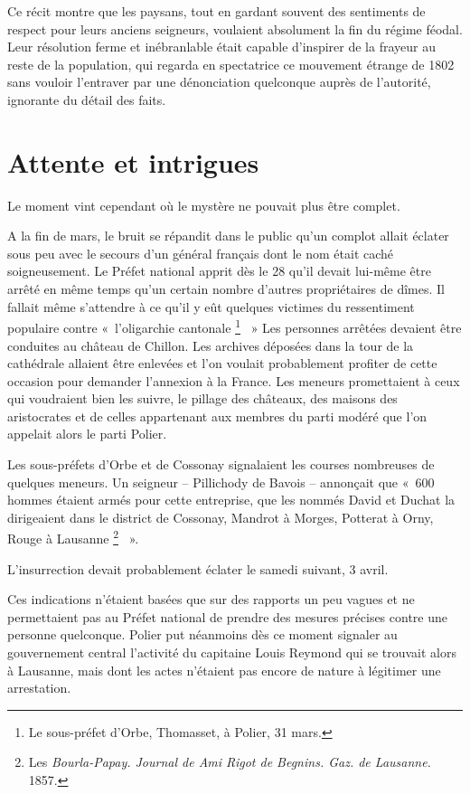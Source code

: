\documentclass[french,twoside]{book} %
\begin{document}
\noindent Ce récit montre que les paysans, tout en gardant souvent des sentiments de respect pour leurs anciens seigneurs, voulaient absolument la fin du régime féodal. Leur résolution ferme et inébranlable était capable d’inspirer de la frayeur au reste de la population, qui regarda en spectatrice ce mouvement étrange de 1802 sans vouloir l’entraver par une dénonciation quelconque auprès de l’autorité, ignorante du détail des faits.
\section[{Attente et intrigues}]{Attente et intrigues}
\noindent Le moment vint cependant où le mystère ne pouvait plus être complet.\par
A la fin de mars, le bruit se répandit dans le public qu’un complot allait éclater sous peu avec le secours d’un général français dont le nom était caché soigneusement. Le Préfet national apprit dès le 28 qu’il devait lui-même être arrêté en même temps qu’un certain nombre d’autres propriétaires de dîmes. Il fallait même s’attendre à ce qu’il y eût quelques victimes du ressentiment populaire contre « l’oligarchie cantonale \footnote{Le sous-préfet d’Orbe, Thomasset, à Polier, 31 mars.}  » Les personnes arrêtées devaient être conduites au château de Chillon. Les archives déposées dans la tour de la cathédrale allaient être enlevées et l’on voulait probablement profiter de cette occasion pour demander l’annexion à la France. Les meneurs promettaient à ceux qui voudraient bien les suivre, le pillage des châteaux, des maisons des aristocrates et de celles appartenant aux membres du parti modéré que l’on appelait alors le parti Polier.\par
Les sous-préfets d’Orbe et de Cossonay signalaient les courses nombreuses de quelques meneurs. Un seigneur – Pillichody de Bavois – annonçait que « 600 hommes étaient armés pour cette entreprise, que les nommés David et Duchat la dirigeaient dans le district de Cossonay, Mandrot à Morges, Potterat à Orny, Rouge à Lausanne \footnote{Les \emph{Bourla-Papay. Journal de Ami Rigot de Begnins. Gaz. de Lausanne.} 1857.}  ».\par
L’insurrection devait probablement éclater le samedi suivant, 3 avril.\par
Ces indications n’étaient basées que sur des rapports un peu vagues et ne permettaient pas au Préfet national de prendre des mesures précises contre une personne quelconque. Polier put néanmoins dès ce moment signaler au gouvernement central l’activité du capitaine Louis Reymond qui se trouvait alors à Lausanne, mais dont les actes n’étaient pas encore de nature à légitimer une arrestation.\par
\end{document}
